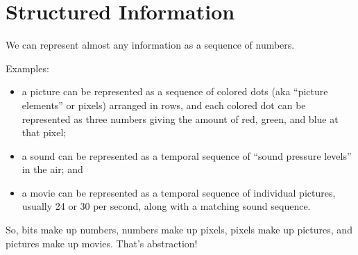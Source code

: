 \documentclass[8pt,a4paper,compress,handout]{beamer}
\begin{document}
\section{Structured Information}
\begin{frame}[fragile]
We can represent almost any information as a sequence of numbers.

\bigskip

Examples: 
\begin{itemize}
\item a picture can be represented as a sequence of colored dots (aka ``picture elements'' or pixels) arranged in rows, and each colored dot can be represented as three numbers giving the amount of red, green, and blue at that pixel;

\item a sound can be represented as a temporal sequence of ``sound pressure levels'' in the air; and 

\item a movie can be represented as a temporal sequence of individual pictures, usually 24 or 30 per second, along with a matching sound sequence.
\end{itemize}

\bigskip

So, bits make up numbers, numbers make up pixels, pixels make up pictures, and pictures make up movies. That's abstraction! 
\end{frame}
\end{document}
